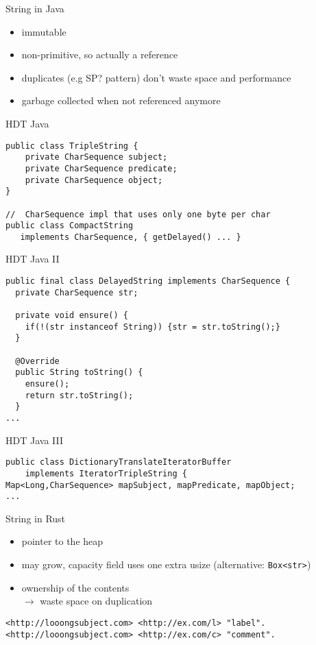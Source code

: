 \documentclass[14pt,aspectratio=169]{beamer}
\newcommand\pro{\item[$+$]}
\newcommand\con{\item[$-$]}
\begin{document}
\begin{frame}{String in Java}
\begin{itemize}
\pro immutable
\pro non-primitive, so actually a reference
\pro duplicates (e.g SP? pattern) don't waste space and performance
\pro garbage collected when not referenced anymore
\end{itemize}
\end{frame}

\begin{frame}[fragile]{HDT Java}
\small
\begin{verbatim}
public class TripleString {
    private CharSequence subject;
    private CharSequence predicate;
    private CharSequence object;
}

//  CharSequence impl that uses only one byte per char
public class CompactString
   implements CharSequence, { getDelayed() ... }
\end{verbatim}
\end{frame}

\begin{frame}[fragile]{HDT Java II}
\small
\begin{verbatim}
public final class DelayedString implements CharSequence {
  private CharSequence str;

  private void ensure() {
    if(!(str instanceof String)) {str = str.toString();}
  }

  @Override
  public String toString() {
    ensure();
    return str.toString();
  }
...
\end{verbatim}
\end{frame}

\begin{frame}[fragile]{HDT Java III}
\small
\begin{verbatim}
public class DictionaryTranslateIteratorBuffer
    implements IteratorTripleString {
Map<Long,CharSequence> mapSubject, mapPredicate, mapObject;
...
\end{verbatim}
\end{frame}

\begin{frame}[fragile]{String in Rust}
\begin{itemize}
\item pointer to the heap
\con may grow, capacity field uses one extra usize (alternative: \texttt{Box<str>})
\con ownership of the contents\\$\rightarrow$ waste space on duplication
\end{itemize}
\begin{verbatim}
<http://looongsubject.com> <http://ex.com/l> "label".
<http://looongsubject.com> <http://ex.com/c> "comment".
\end{verbatim}
\end{frame}
\end{document}
